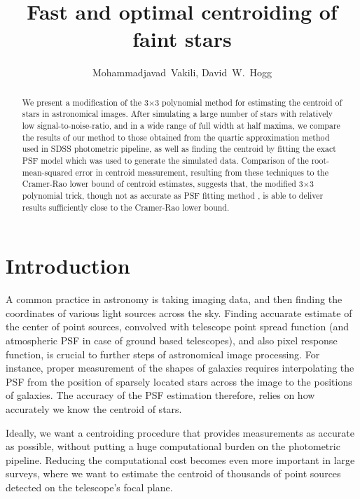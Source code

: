 \documentclass[12pt, preprint]{aastex}
\begin{document}
\author{
  Mohammadjavad~Vakili,
  David~W.~Hogg
}

\title{Fast and optimal centroiding of faint stars}

\begin{abstract}

We present a modification of the 3$\times$3 polynomial method for estimating the centroid 
of stars in astronomical images. After simulating a large number of stars with relatively low 
signal-to-noise-ratio, and in a wide range of full width at half maxima, we compare the results
of our method to those obtained from the quartic approximation method used in SDSS photometric pipeline, 
as well as finding the centroid by fitting the exact PSF model which was used to generate the 
simulated data. Comparison of the root-mean-squared error in centroid measurement, resulting 
from these techniques to the Cramer-Rao lower bound of centroid estimates, 
suggests that, the modified 3$\times$3 polynomial trick, though not as accurate as PSF fitting method
, is able to deliver results sufficiently close to the Cramer-Rao lower bound.

\end{abstract}

\section{Introduction}

A common practice in astronomy is taking imaging data, and then finding the coordinates
of various light sources across the sky. Finding accuarate estimate of the center of point
sources, convolved with telescope point spread function (and atmospheric PSF in case of
ground based telescopes), and also pixel response function, is crucial to further steps of
astronomical image processing. For instance, proper measurement of the shapes of galaxies
requires interpolating the PSF from the position of sparsely located stars across the
image to the positions of galaxies. The accuracy of the PSF estimation therefore,
relies on how accurately we know the centroid of stars. 

Ideally, we want a centroiding procedure that provides measurements as accurate as possible,
without putting a huge computational burden on the photometric pipeline.
Reducing the computational cost becomes even more important in large surveys,
where we want to estimate the centroid of thousands of point sources detected
on the telescope's focal plane. 
\end{document}
